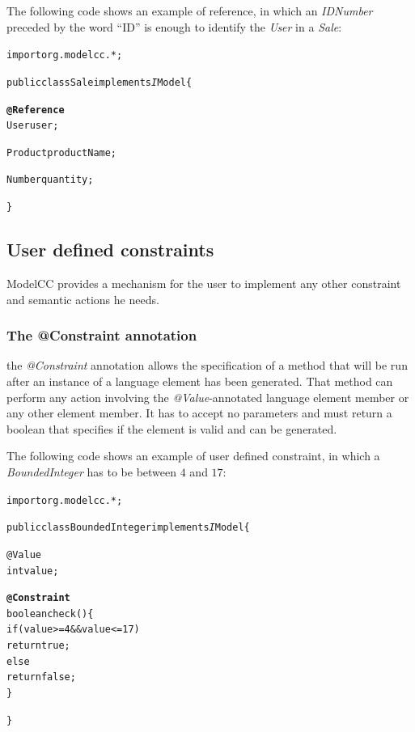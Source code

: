 \documentclass[a4paper,twoside,onecolumn]{article}
\newenvironment{colframe}{%
  \begin{Sbox} 
    \begin{minipage}{.8\columnwidth} 
}{%

  \end{minipage} 
  \end{Sbox} 
  \begin{center} 
    \fcolorbox{black}{MyGray}{\TheSbox} 
  \end{center} 
}
\newcommand{\an}[1]{\emph{#1}} %
\begin{document}
The following code shows an example of reference, in which an \emph{IDNumber} preceded by the word ``ID'' is enough to identify the \emph{User} in a \emph{Sale}:

\begin{colframe}
\begin{alltt}
import org.modelcc.*;

public class Sale implements{\emph IModel} \{

  {\bf @Reference}
  User user;

  Product productName;

  Number quantity;

\}
\end{alltt}
\end{colframe}


\subsection{User defined constraints}

ModelCC provides a mechanism for the user to implement any other constraint and semantic actions he needs.

\subsubsection{The @Constraint annotation}

the \an{@Constraint} annotation allows the specification of a method that will be run after an instance of a language element has been generated. That method can perform any action involving the \an{@Value}-annotated language element member or any other element member. It has to accept no parameters and must return a boolean that specifies if the element is valid and can be generated.

The following code shows an example of user defined constraint, in which a \emph{BoundedInteger} has to be between $4$ and $17$:

\begin{colframe}
\begin{alltt}
import org.modelcc.*;

public class BoundedInteger implements{\emph IModel} \{

  @Value
  int value;

  {\bf @Constraint}
  boolean check() \{
    if (value >= 4 && value <= 17)
      return true;
    else
      return false;
  \}

\}
\end{alltt}
\end{colframe}
\end{document}
